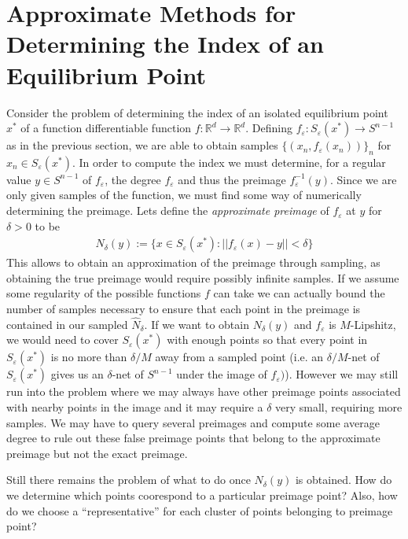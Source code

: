 \documentclass[12pt]{article}
\begin{document}
\section{Approximate Methods for Determining the Index of an Equilibrium Point}
Consider the problem of determining the index of an isolated equilibrium point $x^*$ of a function differentiable function $f:\mathbb{R}^d \rightarrow \mathbb{R}^d$. Defining $f_{\varepsilon} : S_{\varepsilon}(x^*) \rightarrow S^{n-1}$ as in the previous section, we are able to obtain samples $\{\left(x_n, f_{\varepsilon}(x_n)\right)\}_{n}$ for $x_n\in S_{\varepsilon}(x^*)$. In order to compute the index we must determine, for a regular value $y \in S^{n-1}$ of $f_{\varepsilon}$, the degree $f_{\varepsilon}$ and thus the preimage $f_{\varepsilon}^{-1}(y)$. Since we are only given samples of the function, we must find some way of numerically determining the preimage. Lets define the \textit{approximate preimage} of $f_{\varepsilon}$ at $y$ for $\delta>0$ to be
\begin{align}
N_{\delta}(y) := \{x\in S_{\varepsilon}(x^*) : ||f_{\varepsilon}(x) - y || < \delta \}
\end{align}
This allows to obtain an approximation of the preimage through sampling, as obtaining the true preimage would require possibly infinite samples. If we assume some regularity of the possible functions $f$ can take we can actually bound the number of samples necessary to ensure that each point in the preimage is contained in our sampled $\widehat{N}_{\delta}$. If we want to obtain $N_{\delta}(y)$ and $f_{\varepsilon}$ is $M$-Lipshitz, we would need to cover $S_{\varepsilon}(x^*)$ with enough points so that every point in $S_{\varepsilon}(x^*)$ is no more than $\delta/M$ away from a sampled point (i.e. an $\delta/M$-net of $S_{\varepsilon}(x^*)$ gives us an $\delta$-net of $S^{n-1}$ under the image of $f_{\varepsilon})$). However we may still run into the problem where we may always have other preimage points associated with nearby points in the image and it may require a $\delta$ very small, requiring more samples. We may have to query several preimages and compute some average degree to rule out these false preimage points that belong to the approximate preimage but not the exact preimage.

Still there remains the problem of what to do once $N_{\delta}(y)$ is obtained. How do we determine which points coorespond to a particular preimage point? Also, how do we choose a ``representative'' for each cluster of points belonging to preimage point?
\end{document}
